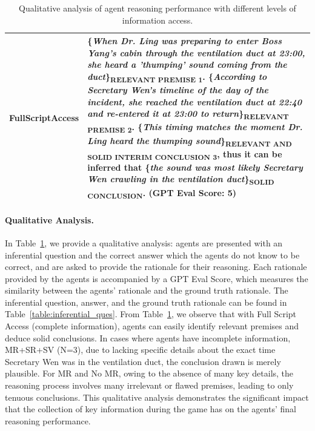 \documentclass[11pt]{article}
\begin{document}
\begin{table}[ht]
{\begin{tabularx}{\textwidth}{|p{0.95cm}|X|}
\hline
\textbf{Full\newline Script\newline Access} & \{\textit{When Dr. Ling was preparing to enter Boss Yang's cabin through the ventilation duct at 23:00, she heard a 'thumping' sound coming from the duct}\}\textsubscript{\textbf{RELEVANT PREMISE 1}}. \{\textit{According to Secretary Wen's timeline of the day of the incident, she reached the ventilation duct at 22:40 and re-entered it at 23:00 to return}\}\textsubscript{\textbf{RELEVANT PREMISE 2}}. \{\textit{This timing matches the moment Dr. Ling heard the thumping sound}\}\textsubscript{\textbf{RELEVANT AND SOLID INTERIM CONCLUSION 3}}, thus it can be inferred that \{\textit{the sound was most likely Secretary Wen crawling in the ventilation duct}\}\textsubscript{\textbf{SOLID CONCLUSION}}. (\textbf{GPT Eval Score: 5}) \\
\hline
\end{tabularx}
}
\caption{Qualitative analysis of agent reasoning performance with different levels of information access.}
\vspace{-4mm}
\label{table:qualitative_analysis}
\end{table}
\paragraph{Qualitative Analysis.}

In Table~\ref{table:qualitative_analysis}, we provide a qualitative analysis: agents are presented with an inferential question and the correct answer which the agents do not know to be correct, and are asked to provide the rationale for their reasoning. Each rationale provided by the agents is accompanied by a GPT Eval Score, which measures the similarity between the agents' rationale and the ground truth rationale. The inferential question, answer, and the ground truth rationale can be found in Table~\ref{table:inferential_ques}. From Table~\ref{table:qualitative_analysis}, we observe that with Full Script Access (complete information), agents can easily identify relevant premises and deduce solid conclusions. In cases where agents have incomplete information, MR+SR+SV (N=3), due to lacking specific details about the exact time Secretary Wen was in the ventilation duct, the conclusion drawn is merely plausible. For MR and No MR, owing to the absence of many key details, the reasoning process involves many irrelevant or flawed premises, leading to only tenuous conclusions. This qualitative analysis demonstrates the significant impact that the collection of key information during the game has on the agents' final reasoning performance.
\end{document}

